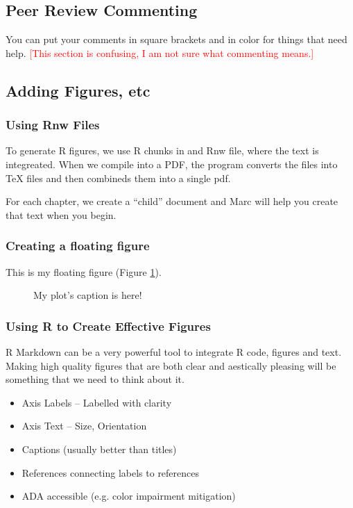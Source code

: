 \documentclass{book}\usepackage{knitr}
\begin{document}
\subsection{Peer Review Commenting}

You can put your comments in square brackets and in color for things that need help. \textcolor{red}{[This section is confusing, I am not sure what commenting means.]}

\subsection{Adding Figures, etc}

\subsubsection{Using Rnw Files}

To generate R figures, we use R chunks in and Rnw file, where the text is integreated. When we compile into a PDF, the program converts the files into TeX files and then combineds them into a single pdf. 

For each chapter, we create a ``child'' document and Marc will help you create that text when you begin. 

\subsubsection{Creating a floating figure}

This is my floating figure (Figure \ref{fig:plot}).

\begin{figure}

\caption{My plot's caption is here!}
\label{fig:plot}
\end{figure}

\subsubsection{Using R to Create Effective Figures}

R Markdown can be a very powerful tool to integrate R code, figures and text. Making high quality figures that are both clear and aestically pleasing will be something that we need to think about it. 

\begin{itemize}
  \item Axis Labels -- Labelled with clarity 
  \item Axis Text -- Size, Orientation 
  \item Captions (usually better than titles)
  \item References connecting labels to references
  \item ADA accessible (e.g. color impairment mitigation)
\end{itemize}
\end{document}
